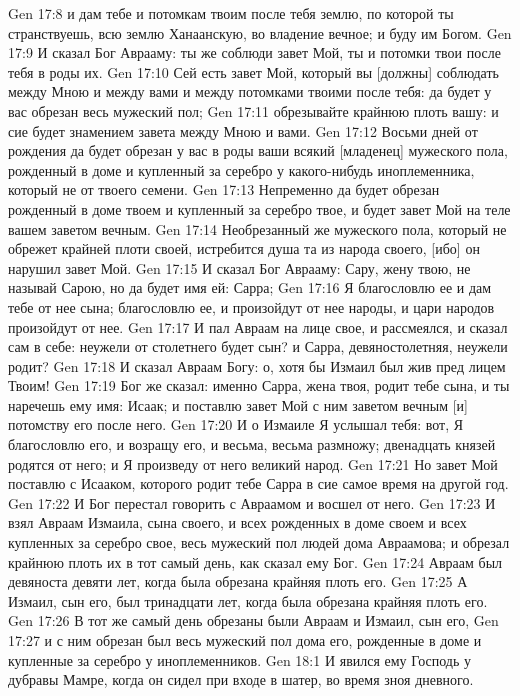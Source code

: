 Gen 17:8  и дам тебе и потомкам твоим после тебя землю, по которой ты странствуешь, всю землю Ханаанскую, во владение вечное; и буду им Богом.
Gen 17:9  И сказал Бог Аврааму: ты же соблюди завет Мой, ты и потомки твои после тебя в роды их.
Gen 17:10  Сей есть завет Мой, который вы [должны] соблюдать между Мною и между вами и между потомками твоими после тебя: да будет у вас обрезан весь мужеский пол;
Gen 17:11  обрезывайте крайнюю плоть вашу: и сие будет знамением завета между Мною и вами.
Gen 17:12  Восьми дней от рождения да будет обрезан у вас в роды ваши всякий [младенец] мужеского пола, рожденный в доме и купленный за серебро у какого-нибудь иноплеменника, который не от твоего семени.
Gen 17:13  Непременно да будет обрезан рожденный в доме твоем и купленный за серебро твое, и будет завет Мой на теле вашем заветом вечным.
Gen 17:14  Необрезанный же мужеского пола, который не обрежет крайней плоти своей, истребится душа та из народа своего, [ибо] он нарушил завет Мой.
Gen 17:15  И сказал Бог Аврааму: Сару, жену твою, не называй Сарою, но да будет имя ей: Сарра;
Gen 17:16  Я благословлю ее и дам тебе от нее сына; благословлю ее, и произойдут от нее народы, и цари народов произойдут от нее.
Gen 17:17  И пал Авраам на лице свое, и рассмеялся, и сказал сам в себе: неужели от столетнего будет сын? и Сарра, девяностолетняя, неужели родит?
Gen 17:18  И сказал Авраам Богу: о, хотя бы Измаил был жив пред лицем Твоим!
Gen 17:19  Бог же сказал: именно Сарра, жена твоя, родит тебе сына, и ты наречешь ему имя: Исаак; и поставлю завет Мой с ним заветом вечным [и] потомству его после него.
Gen 17:20  И о Измаиле Я услышал тебя: вот, Я благословлю его, и возращу его, и весьма, весьма размножу; двенадцать князей родятся от него; и Я произведу от него великий народ.
Gen 17:21  Но завет Мой поставлю с Исааком, которого родит тебе Сарра в сие самое время на другой год.
Gen 17:22  И Бог перестал говорить с Авраамом и восшел от него.
Gen 17:23  И взял Авраам Измаила, сына своего, и всех рожденных в доме своем и всех купленных за серебро свое, весь мужеский пол людей дома Авраамова; и обрезал крайнюю плоть их в тот самый день, как сказал ему Бог.
Gen 17:24  Авраам был девяноста девяти лет, когда была обрезана крайняя плоть его.
Gen 17:25  А Измаил, сын его, был тринадцати лет, когда была обрезана крайняя плоть его.
Gen 17:26  В тот же самый день обрезаны были Авраам и Измаил, сын его,
Gen 17:27  и с ним обрезан был весь мужеский пол дома его, рожденные в доме и купленные за серебро у иноплеменников.
Gen 18:1  И явился ему Господь у дубравы Мамре, когда он сидел при входе в шатер, во время зноя дневного.
